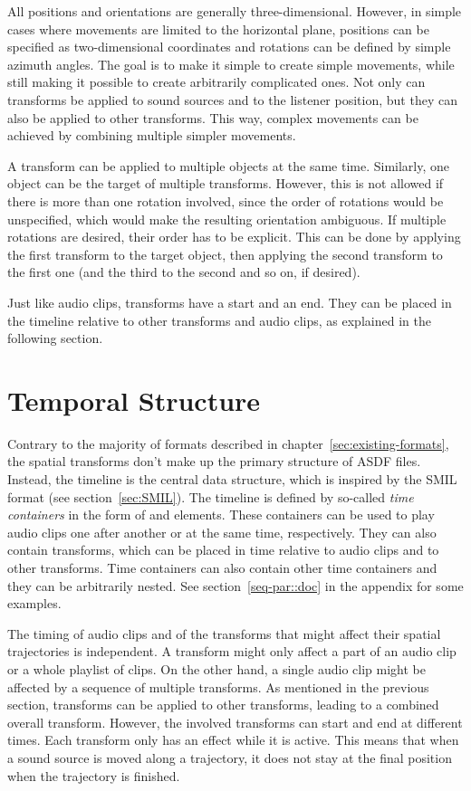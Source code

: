 All positions and orientations are generally three-dimensional.
However, in simple cases where movements are limited to the horizontal plane,
positions can be specified as two-dimensional coordinates and
rotations can be defined by simple azimuth angles.
The goal is to make it simple to create simple movements,
while still making it possible to create arbitrarily complicated ones.
Not only can transforms be applied to sound sources
and to the listener position,
but they can also be applied to other transforms.
This way, complex movements can be achieved by combining
multiple simpler movements.

A transform can be applied to multiple objects at the same time.
Similarly, one object can be the target of multiple transforms.
However, this is not allowed if there is more than one rotation involved,
since the order of rotations would be unspecified,
which would make the resulting orientation ambiguous.
If multiple rotations are desired,
their order has to be explicit.
This can be done by applying the first transform to the target object,
then applying the second transform to the first one
(and the third to the second and so on, if desired).

Just like audio clips,
transforms have a start and an end.
They can be placed in the timeline relative to other transforms and audio clips,
as explained in the following section.


\section{Temporal Structure}

Contrary to the majority of formats described
in chapter~\ref{sec:existing-formats},
the spatial transforms don't make up the primary structure of ASDF files.
Instead, the timeline is the central data structure,
which is inspired by the SMIL format (see section~\ref{sec:SMIL}).
The timeline is defined by so-called \emph{time containers}
in the form of  and  elements.
These containers can be used to play audio clips one after another
or at the same time, respectively.
They can also contain transforms,
which can be placed in time relative to audio clips and to other transforms.
Time containers can also contain other time containers
and they can be arbitrarily nested.
See section~\ref{seq-par::doc} in the appendix for some examples.

The timing of audio clips and of the transforms that might affect their spatial
trajectories is independent.
A transform might only affect a part of an audio clip or a whole playlist
of clips.
On the other hand,
a single audio clip might be affected by a sequence of multiple transforms.
As mentioned in the previous section,
transforms can be applied to other transforms,
leading to a combined overall transform.
However, the involved transforms can start and end at different times.
Each transform only has an effect while it is active.
This means that when a sound source is moved along a trajectory,
it does not stay at the final position when the trajectory is finished.

